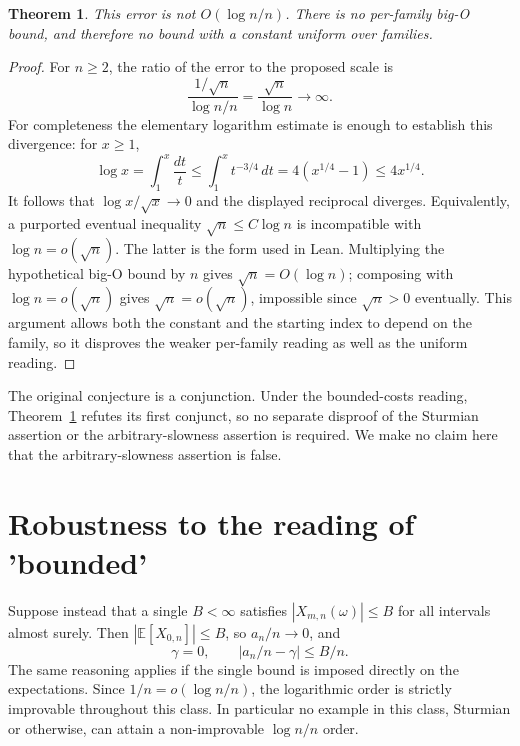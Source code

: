 \documentclass[11pt]{article}
\newtheorem{theorem}{Theorem}
\begin{document}
\begin{theorem}\label{thm:main}
This error is not $O(\log n/n)$. There is no per-family big-O bound,
and therefore no bound with a constant uniform over families.
\end{theorem}
\begin{proof}
For $n\ge2$, the ratio of the error to the proposed scale is
\[\frac{1/\sqrt n}{\log n/n}=\frac{\sqrt n}{\log n}\longrightarrow\infty.
\]
For completeness the elementary logarithm estimate is enough to establish
this divergence: for $x\ge1$,
\[\log x=\int_1^x\frac{dt}{t}
   \le\int_1^x t^{-3/4}\,dt=4(x^{1/4}-1)\le4x^{1/4}.
\]
It follows that $\log x/\sqrt x\to0$ and the displayed reciprocal diverges.
Equivalently, a purported eventual inequality
$\sqrt n\le C\log n$ is incompatible with $\log n=o(\sqrt n)$.
The latter is the form used in Lean. Multiplying the hypothetical big-O
bound by $n$ gives $\sqrt n=O(\log n)$; composing with
$\log n=o(\sqrt n)$ gives $\sqrt n=o(\sqrt n)$, impossible since
$\sqrt n>0$ eventually. This argument allows both the constant and the
starting index to depend on the family, so it disproves the weaker
per-family reading as well as the uniform reading.
\end{proof}
The original conjecture is a conjunction. Under the bounded-costs reading,
Theorem~\ref{thm:main} refutes its first conjunct, so no separate
disproof of the Sturmian assertion or the arbitrary-slowness assertion
is required. We make no claim here that the arbitrary-slowness assertion
is false.

\section{Robustness to the reading of 'bounded'}\label{sec:global}
Suppose instead that a single $B<\infty$ satisfies
$|X_{m,n}(\omega)|\le B$ for all intervals almost surely.
Then $|\mathbb E[X_{0,n}]|\le B$, so $a_n/n\to0$, and
\[\gamma=0,\qquad |a_n/n-\gamma|\le B/n.
\]
The same reasoning applies if the single bound is imposed directly on
the expectations. Since $1/n=o(\log n/n)$, the logarithmic order is
strictly improvable throughout this class. In particular no example in
this class, Sturmian or otherwise, can attain a non-improvable
$\log n/n$ order.
\end{document}
